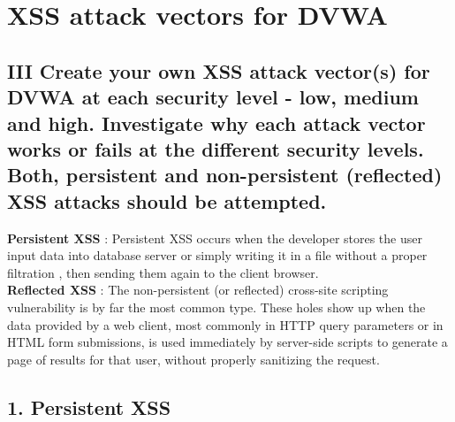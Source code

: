 \documentclass{article}
\begin{document}
\clearpage
\section*{XSS attack vectors for DVWA}
\subsection*{III Create your own XSS attack vector(s) for DVWA at each security level - low,
medium and high. Investigate why each attack vector works or fails at the
different security levels. Both, persistent and non-persistent (reflected) XSS
attacks should be attempted.}
\textbf{Persistent XSS} : Persistent XSS occurs when the developer stores the user input data into database server
or simply writing it in a file without a proper filtration , then sending them again to the client
browser.\\
\textbf{Reflected XSS} : The non-persistent (or reflected) cross-site scripting vulnerability is by far the
most common type. These holes show up when the data provided by a web client, most commonly
in HTTP query parameters or in HTML form submissions, is used immediately by server-side scripts
to generate a page of results for that user, without properly sanitizing the request.\\
\subsection*{1. Persistent XSS}
\end{document}
